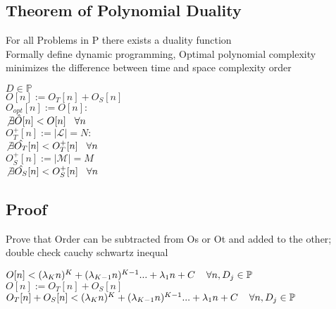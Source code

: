 \documentclass[11pt]{article}
\begin{document}
\subsection{Theorem of Polynomial Duality}
For all Problems in P there exists a duality function\\
Formally define dynamic programming, Optimal polynomial complexity minimizes the difference between time and space complexity order
\begin{center}
\vspace{2mm}
$
D \in \mathbb{P}
$
\\ \vspace{2mm}
$
O[n] := O_T[n] + O_S[n]
$
\\ \vspace{2mm}
$
O_{opt}[n] := O[n] :
$
\\ \vspace{2mm}
$
\not \exists \hat{O} \lbrack n \rbrack < O[n] \hspace{3mm} \forall n
$
\\ \vspace{6mm}
$
O_T^+[n] := |\mathcal{L}| = N :
$
\\ \vspace{2mm}
$
\not \exists \hat{O_T} \lbrack n \rbrack < O^+_{T}[n] \hspace{3mm} \forall n
$
\\ \vspace{2mm}
$
O_S^+[n] := |\mathcal{M}| = M
$
\\ \vspace{2mm}
$
\not \exists \hat{O_S} \lbrack n \rbrack < O^+_{S}[n] \hspace{3mm} \forall n
$
\end{center}







\subsection{Proof}
Prove that Order can be subtracted from Os or Ot and added to the other; double check cauchy schwartz inequal
\begin{center}
$
O[n] < (\lambda_K n)^K + (\lambda_{K-1} n)^{K-1}... + \lambda_1 n + C \hspace{4mm} \forall n, D_j \in \mathbb{P}
$
\\ \vspace{2mm}
$
O[n] := O_T[n] + O_S[n]
$
\\ \vspace{2mm}
$
O_T[n] + O_S[n] < (\lambda_K n)^K + (\lambda_{K-1} n)^{K-1}... + \lambda_1 n + C \hspace{4mm} \forall n, D_j \in \mathbb{P}
$
\end{center}
\end{document}

